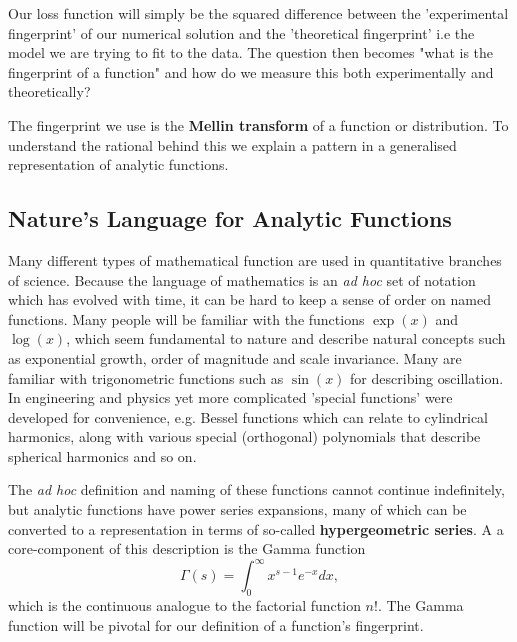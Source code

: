 \documentclass{article}
\begin{document}
Our loss function will simply be the squared difference between the 'experimental fingerprint' of our numerical solution and the 'theoretical fingerprint' i.e the model we are trying to fit to the data. The question then becomes "what is the fingerprint of a function" and how do we measure this both experimentally and theoretically?

The fingerprint we use is the \textbf{Mellin transform} of a function or distribution. To understand the rational behind this we explain a pattern in a generalised representation of analytic functions.


\subsection{Nature's Language for Analytic Functions}
Many different types of mathematical function are used in quantitative branches of science. Because the language of mathematics is an \emph{ad hoc} set of notation which has evolved with time, it can be hard to keep a sense of order on named functions. Many people will be familiar with the functions $\exp(x)$ and $\log(x)$, which seem fundamental to nature and describe natural concepts such as exponential growth, order of magnitude and scale invariance. Many are familiar with trigonometric functions such as $\sin(x)$ for describing oscillation. In engineering and physics yet more complicated 'special functions' were developed for convenience, e.g. Bessel functions which can relate to cylindrical harmonics, along with various special (orthogonal) polynomials that describe spherical harmonics and so on.

The \emph{ad hoc} definition and naming of these functions cannot continue indefinitely, but analytic functions have power series expansions, many of which can be converted to a representation in terms of so-called \textbf{hypergeometric series}. A a core-component of this description is the Gamma function
\begin{equation}
\Gamma(s) = \int_0^\infty x^{s-1} e^{-x}dx,
\end{equation}
which is the continuous analogue to the factorial function $n!$. The Gamma function will be pivotal for our definition of a function's fingerprint.
\end{document}
